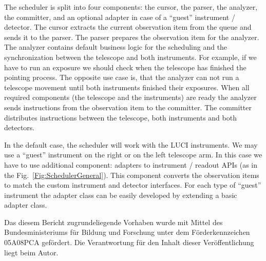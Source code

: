 \documentclass[11pt,twoside]{article}
\begin{document}
The scheduler is split into four components: the cursor, the parser, the analyzer, the committer, and an optional adapter in 
case of a ``guest'' instrument / detector. 
The cursor extracts the current observation item from the queue and sends it to the parser. The parser prepares the observation item
for the analyzer. The analyzer contains default business logic for the scheduling and the synchronization between the telescope and 
both instruments. For example, if we have to run an exposure we should check when the telescope has finished the pointing process.  
The opposite use case is, that the analyzer can not run a telescope movement until both instruments finished their exposures.
When all required components (the telescope and the instruments) are ready the analyzer sends instructions from the observation item to the committer.
The committer distributes instructions between the telescope, both instruments and both detectors.  

In the default case, the scheduler will work with the LUCI instruments. We may use a ``guest'' instrument on the right or on the left telescope arm.
In this case we have to use additional component: adapters to instrument / readout APIs (as in the Fig.~\ref{Fig:SchedulerGeneral}). 
This component converts the observation items to match the custom instrument and detector interfaces. 
For each type of ``guest'' instrument the adapter class can be easily developed by extending a basic adapter class.

\acknowledgements 
Das diesem Bericht zugrundeliegende Vorhaben wurde mit Mittel des Bundesministeriums f\"ur Bildung und Forschung unter dem F\"orderkennzeichen 05A08PCA gef\"ordert. Die Verantwortung f\"ur den Inhalt dieser Ver\"offentlichung liegt beim Autor.

\end{document}
